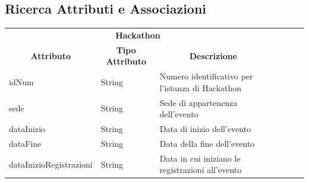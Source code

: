 \documentclass[a4paper, 15pt, oneside]{article}
\begin{document}
	\subsection{Ricerca Attributi e Associazioni}
		\begin{table}[H]
			\begin{tabular}{lllllll}
				\cline{1-3}
				\multicolumn{3}{|c|}{\textbf{Hackathon}}                                                                                                                                                                                                                        &  &  &  &  \\ \cline{1-3}
				\multicolumn{1}{|c|}{\textbf{Attributo}}      & \multicolumn{1}{c|}{\textbf{Tipo Attributo}}                   & \multicolumn{1}{c|}{\textbf{Descrizione}}                                                                                                      &  &  &  &  \\ \cline{1-3}
				\multicolumn{1}{|l|}{idNum}                   & \multicolumn{1}{l|}{String}                                    & \multicolumn{1}{l|}{Numero identificativo per l'istanza di Hackathon}                                                                          &  &  &  &  \\ \cline{1-3}
				\multicolumn{1}{|l|}{sede}                    & \multicolumn{1}{l|}{String}                                    & \multicolumn{1}{l|}{Sede di appartenenza dell'evento}                                                                                          &  &  &  &  \\ \cline{1-3}
				\multicolumn{1}{|l|}{dataInizio}              & \multicolumn{1}{l|}{String}                                    & \multicolumn{1}{l|}{Data di inizio dell'evento}                                                                                                &  &  &  &  \\ \cline{1-3}
				\multicolumn{1}{|l|}{dataFine}                & \multicolumn{1}{l|}{String}                                    & \multicolumn{1}{l|}{Data della fine dell'evento}                                                                                               &  &  &  &  \\ \cline{1-3}
				\multicolumn{1}{|l|}{dataInizioRegistrazioni} & \multicolumn{1}{l|}{String}                                    & \multicolumn{1}{l|}{Data in cui iniziano le registrazioni all'evento}                                                                          &  &  &  &  \\ \cline{1-3}

\end{tabular}
\end{table}
\end{document}
